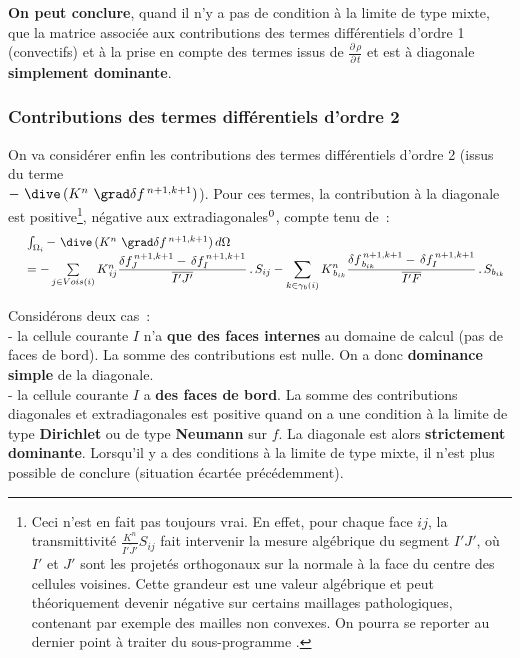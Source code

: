 {\bf On peut conclure}, quand il n'y a pas de condition \`a la limite de type mixte,
que la matrice associ\'ee aux contributions des termes
diff\'erentiels d'ordre 1 (convectifs) et \`a la prise en compte des termes
issus de $\displaystyle \frac{{\partial}\,\rho}{{\partial}\,t}$ et est \`a
diagonale {\bf simplement dominante}.




\subsubsection*{Contributions des termes diff\'erentiels d'ordre 2}

On va consid\'erer enfin les contributions des termes diff\'erentiels
d'ordre 2 (issus du terme \\
$-\ \dive\,(K^n\ \grad \delta f^{\,n+1,k+1})$).
Pour ces termes, la contribution  \`{a} la
diagonale est positive\footnote{\label{Base_Covofi_transmittivite}Ceci n'est en fait pas
toujours
vrai. En effet, pour chaque face $ij$, la transmittivit\'e
$\frac{K^n}{\overline{I'J'}}S_{ij}$
fait intervenir la mesure alg\'ebrique du segment $I'J'$, o\`u $I'$ et $J'$
sont les projet\'es orthogonaux sur la normale \`a la face du centre
des cellules voisines. Cette
grandeur est une valeur alg\'ebrique et peut th\'eoriquement devenir
n\'egative sur certains maillages pathologiques, contenant par exemple des
mailles non convexes. On pourra se reporter au dernier point \`a traiter du sous-programme
.},
n\'{e}gative aux extradiagonales$^{\text{\scriptsize \thefootnote}}$, compte tenu de~:
\begin{equation}
\begin{array}{ll}
&\int_{\Omega_i}-\ \dive\,(K^n\ \grad \delta f^{\,n+1,k+1})\,d\Omega\\
&= -\sum\limits_{j \in Vois(i)} K_{\,ij}^n
\displaystyle \frac{\delta f_{J}^{\,n+1,k+1} -\,\delta f_{I}^{\,n+1,k+1}}{\overline{I'J'}}\,.\,S_{ij}
-\sum\limits_{k \in \gamma_b(i)} K_{\,b_{ik}}^n
\displaystyle\frac{\delta f_{\,b_{ik}}^{\,n+1,k+1} -\,\delta f_{I}^{\,n+1,k+1}}{\overline{I'F}}\,.\,
S_{b_{ik}}
\end{array}
\end{equation}



Consid\'erons deux cas~:\\
\hspace*{1cm}- la cellule courante $I$ n'a {\bf que des faces internes} au domaine de
calcul (pas de faces de bord). La somme des contributions est nulle. On a donc
{\bf dominance simple} de la diagonale. \\
\hspace*{1cm}- la cellule courante $I$ a  {\bf des faces de bord}.  La somme des
contributions diagonales et extradiagonales est positive quand on a une
condition \`a la limite de type {\bf Dirichlet} ou de type {\bf Neumann} sur $f$. La
diagonale est alors {\bf strictement dominante}.
Lorsqu'il y a des conditions \`{a} la limite de type mixte, il n'est plus possible
de conclure (situation \'ecart\'ee pr\'ec\'edemment).\\

